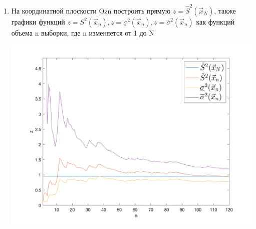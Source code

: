 \documentclass[a4paper,14pt]{extreport} %
\begin{document}
\begin{enumerate}
\newpage

\item На координатной плоскости Ozn построить прямую $z=\hat S^2 (\vec x_N)$, также графики функций $z= S^2 (\vec x_n), z= \underline \sigma^2 (\vec x_n), z =\overline \sigma^2 (\vec x_n)$ как функций объема n выборки, где n изменяется от 1 до N

\includegraphics[scale=0.45]{graph2}

\end{enumerate}
\end{document}
